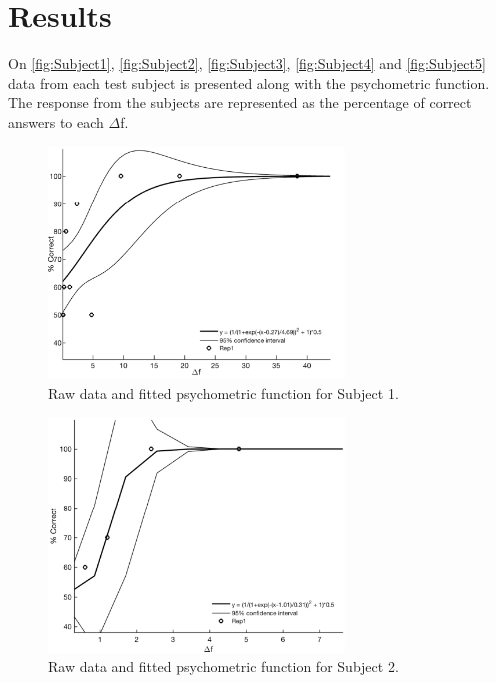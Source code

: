 \section*{Results}
%
On \autoref{fig:Subject1}, \autoref{fig:Subject2}, \autoref{fig:Subject3}, \autoref{fig:Subject4} and \autoref{fig:Subject5} data from each test subject is presented along with the psychometric function. The response from the subjects are represented as the percentage of correct answers to each $\Delta$f.
% 
\begin{figure}[H]
\centering
\includegraphics[width = 0.7\textwidth]{Figure/Vores_Figurer/Subject1} 
\caption{Raw data and fitted psychometric function for Subject 1.}
\label{fig:Subject1}
\end{figure}
%
\begin{figure}[H]
\centering
\includegraphics[width = 0.7\textwidth]{Figure/Vores_Figurer/Subject2} 
\caption{Raw data and fitted psychometric function for Subject 2.}
\label{fig:Subject2}
\end{figure}
%
